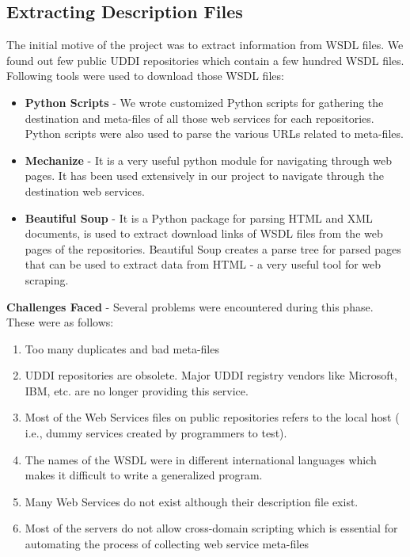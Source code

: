 \documentclass[12pt, oneside]{book}
\begin{document}
\subsection{Extracting Description Files}
The initial motive of the project was to extract information from WSDL files. We found out few public UDDI repositories which contain a few hundred WSDL files. Following tools were used to download those WSDL files:
\begin{itemize}
 \item \textbf{Python Scripts} - We wrote customized Python scripts for gathering the destination and meta-files of all those web services for each repositories. Python scripts were also used to parse the various URLs related to meta-files.
 \item \textbf{Mechanize} - It is a very useful python module for navigating through web pages. It has been used extensively in our project to navigate through the destination web services.
 \item \textbf{Beautiful Soup} - It is a Python package for parsing HTML and XML documents, is used to extract download links of WSDL files from the web pages of the repositories. Beautiful Soup creates a parse tree for parsed pages that can be used to extract data from HTML - a very useful tool for web scraping.
\end{itemize}
\textbf{Challenges Faced} - Several problems were encountered during this phase. These were as follows:
\begin{enumerate}
 \item Too many duplicates and bad meta-files
 \item UDDI repositories are obsolete. Major UDDI registry vendors like Microsoft, IBM, etc. are no longer providing this service.
 \item Most of the Web Services files on public repositories refers to the local host ( i.e., dummy services created by programmers to test).
 \item The names of the WSDL were in different international languages which makes it difficult to write a generalized program.
 \item Many Web Services do not exist although their description file exist.
 \item Most of the servers do not allow cross-domain scripting which is essential for automating the process of collecting web service meta-files
\end{enumerate}
\end{document}
